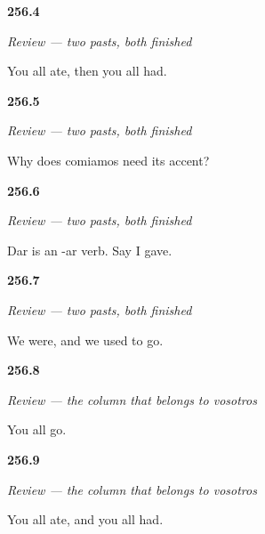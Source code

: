 \noindent\begin{minipage}[t]{\linewidth}
\raggedright
\hypertarget{review-ES-C65-repaso-dos-pasados-isteis}{\textbf{256.4}} \emph{Review — two pasts, both finished}\par
\small You all ate, then you all had.
\end{minipage}\par\medskip

\noindent\begin{minipage}[t]{\linewidth}
\raggedright
\hypertarget{review-ES-C65-repaso-dos-pasados-acento}{\textbf{256.5}} \emph{Review — two pasts, both finished}\par
\small Why does comiamos need its accent?
\end{minipage}\par\medskip

\noindent\begin{minipage}[t]{\linewidth}
\raggedright
\hypertarget{review-ES-C65-repaso-dos-pasados-di}{\textbf{256.6}} \emph{Review — two pasts, both finished}\par
\small Dar is an -ar verb. Say I gave.
\end{minipage}\par\medskip

\noindent\begin{minipage}[t]{\linewidth}
\raggedright
\hypertarget{review-ES-C65-repaso-dos-pasados-irregulares}{\textbf{256.7}} \emph{Review — two pasts, both finished}\par
\small We were, and we used to go.
\end{minipage}\par\medskip

\noindent\begin{minipage}[t]{\linewidth}
\raggedright
\hypertarget{review-ES-C65-repaso-columna-vosotros-presente}{\textbf{256.8}} \emph{Review — the column that belongs to \emph{vosotros}}\par
\small You all go.
\end{minipage}\par\medskip

\noindent\begin{minipage}[t]{\linewidth}
\raggedright
\hypertarget{review-ES-C65-repaso-columna-vosotros-preterito}{\textbf{256.9}} \emph{Review — the column that belongs to \emph{vosotros}}\par
\small You all ate, and you all had.
\end{minipage}\par\medskip

